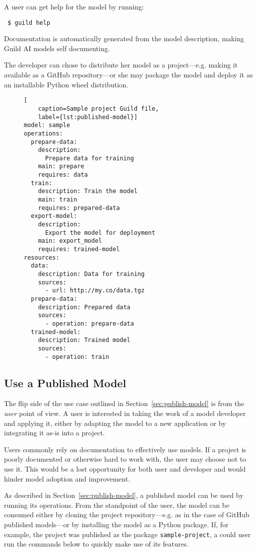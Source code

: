 \documentclass{article}
\begin{document}
A user can get help for the model by running:

{\footnotesize
\begin{verbatim}
 $ guild help
\end{verbatim}}

Documentation is automatically generated from the model description,
making Guild AI models self documenting.

The developer can chose to distribute her model as a
project---e.g. making it available as a GitHub repository---or she may
package the model and deploy it as an installable Python wheel
distribution.

\begin{figure}
\begin{lstlisting}[
    caption=Sample project Guild file,
    label={lst:published-model}]
model: sample
operations:
  prepare-data:
    description:
      Prepare data for training
    main: prepare
    requires: data
  train:
    description: Train the model
    main: train
    requires: prepared-data
  export-model:
    description:
      Export the model for deployment
    main: export_model
    requires: trained-model
resources:
  data:
    description: Data for training
    sources:
      - url: http://my.co/data.tgz
  prepare-data:
    description: Prepared data
    sources:
      - operation: prepare-data
  trained-model:
    description: Trained model
    sources:
      - operation: train
\end{lstlisting}
\end{figure}

\subsection{Use a Published Model}
\label{sec:use-model}

The flip side of the use case outlined in
Section~\ref{sec:publish-model} is from the \emph{user} point of
view. A user is interested in taking the work of a model developer and
applying it, either by adapting the model to a new application or by
integrating it as-is into a project.

Users commonly rely on documentation to effectively use models. If a
project is poorly documented or otherwise hard to work with, the user
may choose not to use it. This would be a lost opportunity for both
user and developer and would hinder model adoption and improvement.

As described in Section~\ref{sec:publish-model}, a published model can
be used by running its operations. From the standpoint of the user,
the model can be consumed either by cloning the project
repository---e.g. as in the case of GitHub published models---or by
installing the model as a Python package. If, for example, the project
was published as the package \verb|sample-project|, a could user run
the commands below to quickly make use of its features.
\end{document}

